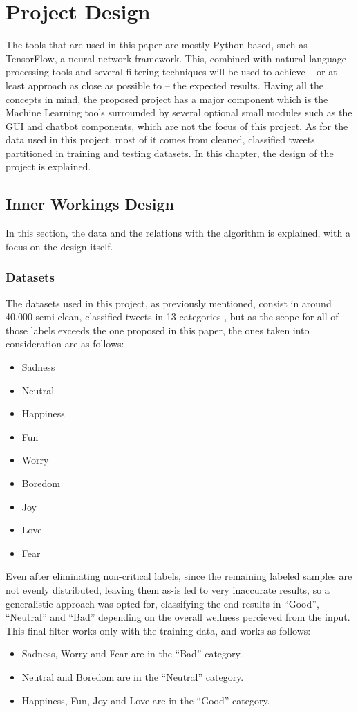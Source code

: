 \chapter{Project Design}
\label{ch4}
The tools that are used in this paper are mostly Python-based, such as TensorFlow, a neural network framework. This, combined with natural language processing tools and several filtering techniques will be used to achieve -- or at least approach as close as possible to -- the expected results.
Having all the concepts in mind, the proposed project has a major component which is the Machine Learning tools surrounded by several optional small modules such as the GUI and chatbot components, which are not the focus of this project.
As for the data used in this project, most of it comes from cleaned, classified tweets partitioned in training and testing datasets.
In this chapter, the design of the project is explained.

\section{Inner Workings Design}
In this section, the data and the relations with the algorithm is explained, with a focus on the design itself.
\subsection{Datasets}
The datasets used in this project, as previously mentioned, consist in around 40,000 semi-clean, classified tweets in 13 categories \citep{rf20}, but as the scope for all of those labels exceeds the one proposed in this paper, the ones taken into consideration are as follows:
\begin{itemize}
	\item Sadness
	\item Neutral
	\item Happiness
	\item Fun
	\item Worry
	\item Boredom
	\item Joy
	\item Love
	\item Fear
\end{itemize}
Even after eliminating non-critical labels, since the remaining  labeled samples are not evenly distributed, leaving them as-is led to very inaccurate results, so a generalistic approach was opted for, classifying the end results in ``Good'', ``Neutral'' and ``Bad'' depending on the overall wellness percieved from the input.
This final filter works only with the training data, and works as follows:
\begin{itemize}
	\item Sadness, Worry and Fear are in the ``Bad'' category.
	\item Neutral and Boredom are in the ``Neutral'' category.
	\item Happiness, Fun, Joy and Love are in the ``Good'' category.
\end{itemize}

